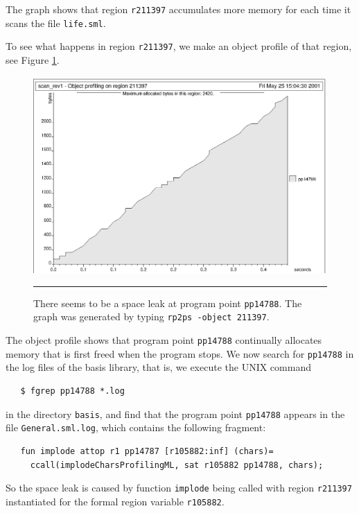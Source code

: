 \documentclass[12pt]{book}
\begin{document}
The graph shows that region \texttt{r211397} accumulates more memory
for each time it scans the file {\tt life.sml}.

To see what happens in region \texttt{r211397}, we make an object profile of
that region, see Figure \ref{scan_rev1_2.fig}.
\begin{figure}
\begin{center}
  \includegraphics{scan_rev1_2.ps}
\end{center}
\caption{There seems to be a space leak at program point
  \texttt{pp14788}. The graph was generated by typing \texttt{rp2ps
    -object 211397}.}
\label{scan_rev1_2.fig}
\medskip\hrule
\end{figure}
The object profile shows that program point \texttt{pp14788}
continually allocates memory that is first freed when the program
stops. We now search for \texttt{pp14788} in the log files of the basis
library, that is, we execute the UNIX command
\begin{verbatim}
   $ fgrep pp14788 *.log
\end{verbatim}
in the directory {\tt basis}, and find that the program point {\tt pp14788}
appears in the file {\tt General.sml.log}, which contains the following
fragment:
\begin{verbatim}
   fun implode attop r1 pp14787 [r105882:inf] (chars)= 
     ccall(implodeCharsProfilingML, sat r105882 pp14788, chars); 
\end{verbatim}
So the space leak is caused by function {\tt implode} being called
with region {\tt r211397} instantiated for the formal region variable
{\tt r105882}.
\end{document}
